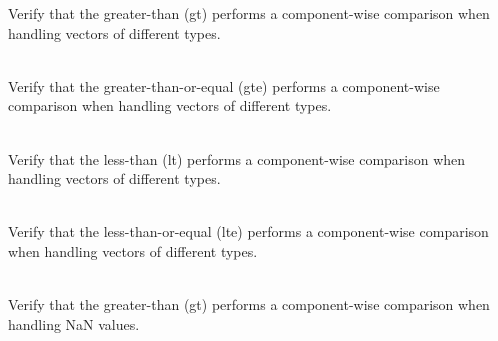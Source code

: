 \begin{DoxyRefList}
\label{test__test000048}%
%
Verify that the  greater-\/than (gt) performs a component-\/wise comparison when handling vectors of different types.  
\item[{\parbox[t]{\linewidth}{Member \doxylink{group___f_g_m___vec4___g_t_e___comp_ga9d5793aa6315ed836be0c04b05fe17f0}{Vector4\+DComparison\+\_\+\+Mixed\+Type\+\_\+\+Greater\+Than\+Or\+Equal\+\_\+\+Returns\+Boolean\+Vector\+With\+Correct\+Values} ()}}]\hfill \\
\label{test__test000054}%
%
Verify that the  greater-\/than-\/or-\/equal (gte) performs a component-\/wise comparison when handling vectors of different types.  
\item[{\parbox[t]{\linewidth}{Member \doxylink{group___f_g_m___vec4___l_t___comp_ga5205f88615eb7aceacd127676c9e97f9}{Vector4\+DComparison\+\_\+\+Mixed\+Type\+\_\+\+Less\+Than\+\_\+\+Returns\+Boolean\+Vector\+With\+Correct\+Values} ()}}]\hfill \\
\label{test__test000060}%
%
Verify that the  less-\/than (lt) performs a component-\/wise comparison when handling vectors of different types.  
\item[{\parbox[t]{\linewidth}{Member \doxylink{group___f_g_m___vec4___l_t_e___comp_gafd67f17de1f8dc4847623501957a9be0}{Vector4\+DComparison\+\_\+\+Mixed\+Type\+\_\+\+Less\+Than\+Or\+Equal\+\_\+\+Returns\+Boolean\+Vector\+With\+Correct\+Values} ()}}]\hfill \\
\label{test__test000066}%
%
Verify that the  less-\/than-\/or-\/equal (lte) performs a component-\/wise comparison when handling vectors of different types.  
\item[{\parbox[t]{\linewidth}{Member \doxylink{group___f_g_m___vec4___g_t___comp_ga6561e269785dc47791e52a67a4eefb39}{Vector4\+DComparison\+\_\+\+Na\+NVector\+\_\+\+Greater\+Than\+\_\+\+Returns\+Boolean\+Vector\+With\+Correct\+Values} ()}}]\hfill \\
\label{test__test000047}%
%
Verify that the  greater-\/than (gt) performs a component-\/wise comparison when handling NaN values.  
\item[{\parbox[t]{\linewidth}{Member \doxylink{group___f_g_m___vec4___g_t_e___comp_ga0e50405ca0c67ea445d84349a4b1a26d}{Vector4\+DComparison\+\_\+\+Nan\+Vector\+\_\+\+Greater\+Than\+Or\+Equal\+\_\+\+Returns\+Boolean\+Vector\+With\+Correct\+Values} ()}}]\hfill \\

\end{DoxyRefList}
